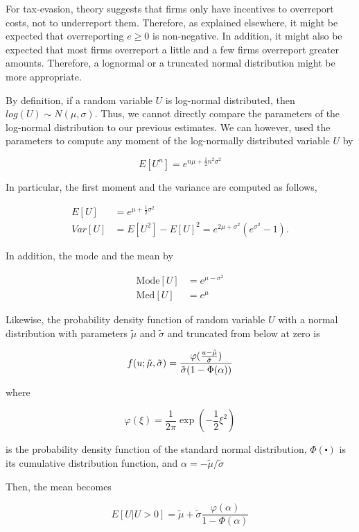 \documentclass[
  12pt]{article}
\theoremstyle{definition}
\theoremstyle{remark}
\begin{document}
For tax-evasion, theory suggests that firms only have incentives to
overreport costs, not to underreport them. Therefore, as explained
elsewhere, it might be expected that overreporting \(e\ge0\) is
non-negative. In addition, it might also be expected that most firms
overreport a little and a few firms overreport greater amounts.
Therefore, a lognormal or a truncated normal distribution might be more
appropriate.

By definition, if a random variable \(U\) is log-normal distributed,
then \(log(U)\sim N(\mu, \sigma)\). Thus, we cannot directly compare the
parameters of the log-normal distribution to our previous estimates. We
can however, used the parameters to compute any moment of the
log-normally distributed variable \(U\) by

\[
E[U^n]=e^{n\mu+\frac{1}{2}n^2\sigma^2}
\]

In particular, the first moment and the variance are computed as
follows,

\[
\begin{aligned}  
E[U]&=e^{\mu+\frac{1}{2}\sigma^2}\\
Var[U]&=E[U^2]-E[U]^2=e^{2\mu+\sigma^2}(e^{\sigma^2}-1).
\end{aligned}
\]

In addition, the mode and the mean by

\[
\begin{aligned}
  \text{Mode}[U]&=e^{\mu-\sigma^2} \\
  \text{Med}[U]&=e^{\mu}
\end{aligned}
\]

Likewise, the probability density function of random variable \(U\) with
a normal distribution with parameters \(\tilde\mu\) and \(\tilde\sigma\)
and truncated from below at zero is

\[
  f(u\\;\tilde\mu,\tilde\sigma) = \frac{\varphi(\frac{u-\tilde\mu}{\tilde\sigma})}{\tilde\sigma (1-\Phi(\alpha))}
\]

where

\[
\varphi(\xi)=\frac{1}{2\pi}\exp(-\frac{1}{2}\xi^2)
\]

is the probability density function of the standard normal distribution,
\(\Phi(\centerdot)\) is its cumulative distribution function, and
\(\alpha=-\tilde\mu/\tilde\sigma\)

Then, the mean becomes

\[
E[U|U>0]=\tilde\mu+\tilde\sigma\frac{\varphi(\alpha)}{1-\Phi(\alpha)}
\]
\end{document}

